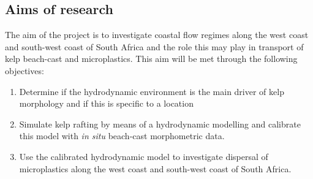 \documentclass[]{article}
\providecommand{\tightlist}{%
  \setlength{\itemsep}{0pt}\setlength{\parskip}{0pt}}
\begin{document}
\subsection{Aims of research}\label{aims-of-research}

The aim of the project is to investigate coastal flow regimes along the
west coast and south-west coast of South Africa and the role this may
play in transport of kelp beach-cast and microplastics. This aim will be
met through the following objectives:

\begin{enumerate}
\def\labelenumi{\Alph{enumi})}
\tightlist
\item
  Determine if the hydrodynamic environment is the main driver of kelp
  morphology and if this is specific to a location
\item
  Simulate kelp rafting by means of a hydrodynamic modelling and
  calibrate this model with \emph{in situ} beach-cast morphometric data.
\item
  Use the calibrated hydrodynamic model to investigate dispersal of
  microplastics along the west coast and south-west coast of South
  Africa.
\end{enumerate}
\end{document}

